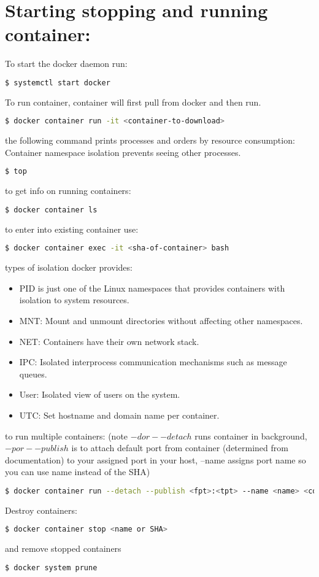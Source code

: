 \documentclass{article}
\begin{document}
\section{Starting stopping and running container:}
 To start the docker daemon run:
 \begin{lstlisting}[language=bash]
  $ systemctl start docker
\end{lstlisting}
To run container, container will first pull from docker and then run.
 \begin{lstlisting}[language=bash]
 $ docker container run -it <container-to-download>
 \end{lstlisting}
 the following command prints processes and orders by resource consumption:
 Container namespace isolation prevents seeing other processes.
 \begin{lstlisting}[language=bash]
 $ top
 \end{lstlisting}
 to get info on running containers:
  \begin{lstlisting}[language=bash]
 $ docker container ls
 \end{lstlisting}
to enter into existing container use:
  \begin{lstlisting}[language=bash]
 $ docker container exec -it <sha-of-container> bash
 \end{lstlisting}
types of isolation docker provides:
\begin{itemize}
    \item PID is just one of the Linux namespaces that provides containers with isolation to system resources.
    \item MNT: Mount and unmount directories without affecting other namespaces.
    \item NET: Containers have their own network stack.
    \item IPC: Isolated interprocess communication mechanisms such as message queues.
    \item User: Isolated view of users on the system.
    \item UTC: Set hostname and domain name per container.
\end{itemize}
to run multiple containers: (note $-d or --detach$ runs container in background, $-p or --publish$ is to attach default port from container (determined from documentation) to your assigned port in your host, --name assigns port name so you can use name instead of the SHA)
  \begin{lstlisting}[language=bash]
$ docker container run --detach --publish <fpt>:<tpt> --name <name> <cont>
 \end{lstlisting}
 Destroy containers: 
  \begin{lstlisting}[language=bash]
$ docker container stop <name or SHA>
 \end{lstlisting}
 and remove stopped containers 
  \begin{lstlisting}[language=bash]
 $ docker system prune
 \end{lstlisting}
 
\end{document}
